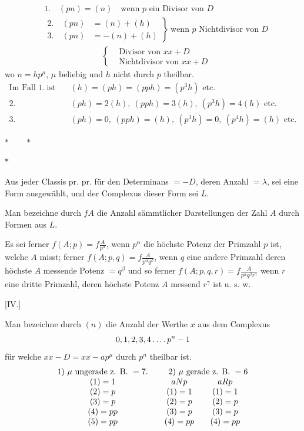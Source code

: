 %
\[
\begin{aligned}
&1.\quad(pn)=(n)\quad\text{wenn }p\text{ ein Divisor von }D\\
&\left.\begin{aligned}2.\quad(pn)&=(n)+(h)\\3.\quad(pn)&=-(n)+(h)\end{aligned}\right\}
\ \text{wenn }p\text{ Nichtdivisor von }D\\
&\hspace{7em}\left\{\begin{aligned}&\text{Divisor von }xx+D\\&\text{Nichtdivisor von }xx+D\end{aligned}\right.
\end{aligned}
\]
wo $n=hp^\mu$, $\mu$ beliebig und $h$ nicht durch $p$ theilbar.
\[
\begin{aligned}
\text{Im Fall }1.\ \text{ist}\quad&(h)=(ph)=(pph)=(p^3h)\text{ etc.}\\
2.\quad&(ph)=2(h),\ (pph)=3(h),\ (p^3h)=4(h)\text{ etc.}\\
3.\quad&(ph)=0,\ (pph)=(h),\ (p^3h)=0,\ (p^4h)=(h)\text{ etc.}
\end{aligned}
\]
\begin{center}$\ast\qquad\ast$\par$\ast$\end{center}

Aus jeder Classis pr. pr. für den Determinans $=-D$, deren Anzahl $=\lambda$, sei eine Form ausgewählt, und der Complexus dieser Form sei $L$.

Man bezeichne durch $fA$ die Anzahl sämmtlicher Darstellungen der Zahl $A$ durch Formen aus $L$.

Es sei ferner $f(A;p)=f\frac A{p^\alpha}$, wenn $p^\alpha$ die höchste Potenz der Primzahl $p$ ist, welche $A$ misst; ferner $f(A;p,q)=f\frac A{p^\alpha q^\beta}$, wenn $q$ eine andere Primzahl deren höchste $A$ messende Potenz $=q^\beta$ und so ferner $f(A;p,q,r)=f\frac A{p^\alpha q^\beta r^\gamma}$ wenn $r$ eine dritte Primzahl, deren höchste Potenz $A$ messend $r^\gamma$ ist u. s. w.

\par\bigskip{}\centerline{[IV.]}\medskip
Man bezeichne durch $(n)$ die Anzahl der Werthe $x$ aus dem Complexus
\[
0,1,2,3,4\mathinner{.\,.\,.\,.} p^n-1
\]
für welche $xx-D=xx-ap^\mu$ durch $p^n$ theilbar ist.
\[
\begin{array}{c@{\qquad}cc}
1)\ \mu\text{ ungerade z. B. }=7.&\multicolumn2c{2)\ \mu\text{ gerade z. B. }=6}\\
(1)=1&aNp&aRp\\
(2)=p&(1)=1&(1)=1\\
(3)=p&(2)=p&(2)=p\\
(4)=pp&(3)=p&(3)=p\\
(5)=pp&(4)=pp&(4)=pp
\end{array}
\]


